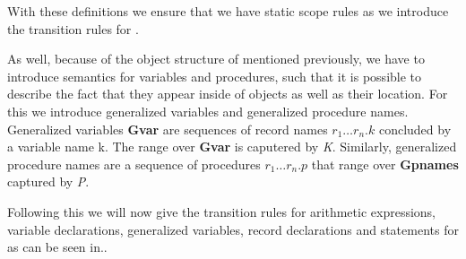 With these definitions we ensure that we have static scope rules as we introduce the transition rules for \dazel{}.

As well, because of the object structure of \dazel{} mentioned previously, we have to introduce semantics for variables and procedures, such that it is possible to describe the fact that they appear inside of objects as well as their location. For this we introduce generalized variables and generalized procedure names.
Generalized variables \textbf{Gvar} are sequences of record names $r_1 \ldots r_n.k$ concluded by a variable name k. The range over \textbf{Gvar} is caputered by \textit{K}.  
Similarly, generalized procedure names are a sequence of procedures $r_1 \ldots r_n.p$ that range over \textbf{Gpnames} captured by \textit{P}.

Following this we will now give the transition rules for arithmetic expressions, variable declarations, generalized variables, record declarations and statements for \dazel{} as can be seen in..

